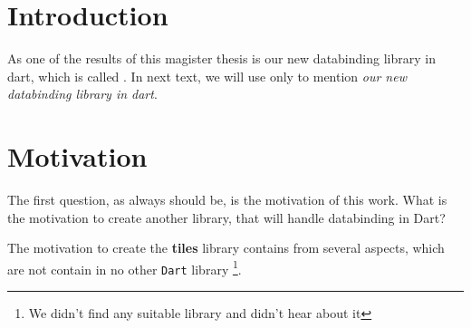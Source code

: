 \documentclass[oneside, 12pt]{book}
\begin{document}

\pagestyle{plain}
\chapter*{Introduction}\label{chap:intro}

As one of the results of this magister thesis is our new databinding library in dart, 
which is called \tiles. 
In next  text, we will use only \tiles to mention \textit{our new databinding library in dart}.


\pagestyle{headings}
\chapter{Motivation}\label{chap:motivation}

The first question, as always should be, is the motivation of this work. 
What is the motivation to create another library, that will handle databinding in Dart?

The motivation to create the \textbf{tiles} library contains from several aspects, 
which are not contain in no other \texttt{Dart} library
\footnote{We didn't find any suitable library and didn't hear about it}.
\end{document}
